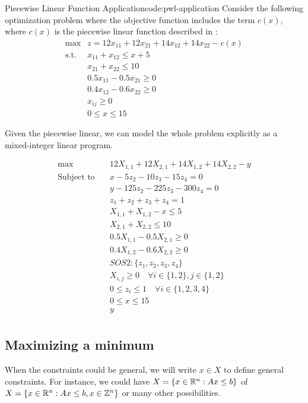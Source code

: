\documentclass[../open-optimization/open-optimization.tex]{subfiles}
\begin{document}
\begin{examplewithcode}{Piecewise Linear Function Application}{code:pwl-application}
\label{example:pwl-application}
Consider the following optimization problem where the objective function includes the term $c(x)$, where $c(x)$ is the piecewise linear function described in :
$$
\begin{array}{cc}
\max & z = 12x_{11} + 12x_{21} + 14x_{12} + 14x_{22} - c(x)\\
\text{s.t.} & x_{11} + x_{12} \leq x + 5\\
& x_{21} + x_{22} \leq 10\\
& 0.5 x_{11} - 0.5x_{21} \geq 0\\
& 0.4 x_{12} - 0.6 x_{22} \geq 0\\
& x_{ij} \geq 0\\
& 0 \leq x \leq 15
\end{array}
$$

Given the piecewise linear, we can model the whole problem explicitly as a mixed-integer linear program.

 \begin{align*}
 \max\quad & 12 X_{1,1} + 12 X_{2,1} + 14 X_{1,2} + 14 X_{2,2} - y\\
\text{Subject to} \quad & x - 5 z_{2} - 10 z_{3} - 15 z_{4} = 0\\
 & y - 125 z_{2} - 225 z_{3} - 300 z_{4} = 0\\
 & z_{1} + z_{2} + z_{3} + z_{4} = 1\\
 & X_{1,1} + X_{1,2} - x \leq 5\\
 & X_{2,1} + X_{2,2} \leq 10\\
 & 0.5 X_{1,1} - 0.5 X_{2,1} \geq 0\\
 & 0.4 X_{1,2} - 0.6 X_{2,2} \geq 0\\
 & SOS2: \{z_1, z_2, z_3, z_4\}\\
 & X_{i,j} \geq 0 \quad\forall i \in \{1,2\}, j \in \{1,2\}\\
 & 0 \leq z_{i} \leq 1 \quad\forall i \in \{1,2,3,4\}\\
 & 0 \leq x \leq 15\\
 & y\\
\end{align*}

\end{examplewithcode}


\subsection{Maximizing a minimum}
When the constraints could be general, we will write $x \in X$ to define general constraints.  For instance, we could have $X = \{ x \in {\mathbb{R}}^n : Ax \leq b\}$ of $X  = \{ x \in {\mathbb{R}}^n : Ax \leq b, x \in {\mathbb{Z}}^n\}$ or many other possibilities.  
\end{document}
